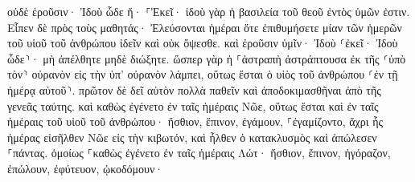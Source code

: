 \documentclass{openreader}
\begin{document}
οὐδὲ ἐροῦσιν· Ἰδοὺ ὧδε ἤ· ⸀Ἐκεῖ· ἰδοὺ γὰρ ἡ βασιλεία τοῦ θεοῦ ἐντὸς ὑμῶν ἐστιν. 
Εἶπεν δὲ πρὸς τοὺς μαθητάς· Ἐλεύσονται ἡμέραι ὅτε ἐπιθυμήσετε μίαν τῶν ἡμερῶν τοῦ υἱοῦ τοῦ ἀνθρώπου ἰδεῖν καὶ οὐκ ὄψεσθε. 
καὶ ἐροῦσιν ὑμῖν· Ἰδοὺ ⸂ἐκεῖ· Ἰδοὺ ὧδε⸃· μὴ ἀπέλθητε μηδὲ διώξητε. 
ὥσπερ γὰρ ἡ ⸀ἀστραπὴ ἀστράπτουσα ἐκ τῆς ⸂ὑπὸ τὸν⸃ οὐρανὸν εἰς τὴν ὑπ’ οὐρανὸν λάμπει, οὕτως ἔσται ὁ υἱὸς τοῦ ἀνθρώπου ⸂ἐν τῇ ἡμέρᾳ αὐτοῦ⸃. 
πρῶτον δὲ δεῖ αὐτὸν πολλὰ παθεῖν καὶ ἀποδοκιμασθῆναι ἀπὸ τῆς γενεᾶς ταύτης. 
καὶ καθὼς ἐγένετο ἐν ταῖς ἡμέραις Νῶε, οὕτως ἔσται καὶ ἐν ταῖς ἡμέραις τοῦ υἱοῦ τοῦ ἀνθρώπου· 
ἤσθιον, ἔπινον, ἐγάμουν, ⸀ἐγαμίζοντο, ἄχρι ἧς ἡμέρας εἰσῆλθεν Νῶε εἰς τὴν κιβωτόν, καὶ ἦλθεν ὁ κατακλυσμὸς καὶ ἀπώλεσεν ⸀πάντας. 
ὁμοίως ⸀καθὼς ἐγένετο ἐν ταῖς ἡμέραις Λώτ· ἤσθιον, ἔπινον, ἠγόραζον, ἐπώλουν, ἐφύτευον, ᾠκοδόμουν· 
\end{document}
